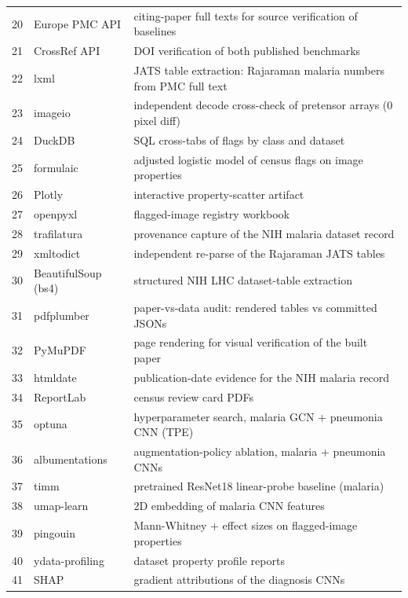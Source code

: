 \begin{longtable}{r p{4.6cm} p{8.2cm}}
20 & Europe PMC API & citing-paper full texts for source verification of baselines \\
21 & CrossRef API & DOI verification of both published benchmarks \\
22 & lxml & JATS table extraction: Rajaraman malaria numbers from PMC full text \\
23 & imageio & independent decode cross-check of pretensor arrays (0 pixel diff) \\
24 & DuckDB & SQL cross-tabs of flags by class and dataset \\
25 & formulaic & adjusted logistic model of census flags on image properties \\
26 & Plotly & interactive property-scatter artifact \\
27 & openpyxl & flagged-image registry workbook \\
28 & trafilatura & provenance capture of the NIH malaria dataset record \\
29 & xmltodict & independent re-parse of the Rajaraman JATS tables \\
30 & BeautifulSoup (bs4) & structured NIH LHC dataset-table extraction \\
31 & pdfplumber & paper-vs-data audit: rendered tables vs committed JSONs \\
32 & PyMuPDF & page rendering for visual verification of the built paper \\
33 & htmldate & publication-date evidence for the NIH malaria record \\
34 & ReportLab & census review card PDFs \\
35 & optuna & hyperparameter search, malaria GCN + pneumonia CNN (TPE) \\
36 & albumentations & augmentation-policy ablation, malaria + pneumonia CNNs \\
37 & timm & pretrained ResNet18 linear-probe baseline (malaria) \\
38 & umap-learn & 2D embedding of malaria CNN features \\
39 & pingouin & Mann-Whitney + effect sizes on flagged-image properties \\
40 & ydata-profiling & dataset property profile reports \\
41 & SHAP & gradient attributions of the diagnosis CNNs \\
\hline
\end{longtable}

